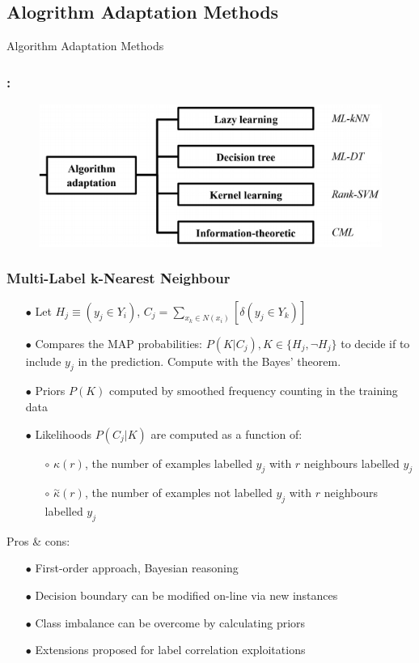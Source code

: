 \documentclass{beamer}
\begin{document}
\subsection{Alogrithm Adaptation Methods}
\begin{frame}
\Huge{\centerline{Algorithm Adaptation Methods}}
\end{frame}
\begin{frame}
\frametitle{\insertsection : \insertsubsection}
\begin{figure}
\begin{center}
\includegraphics[scale = 0.75]{images/aa.png}
\end{center}
\end{figure}
\end{frame}
\begin{frame}
\frametitle{Multi-Label k-Nearest Neighbour}
\begin{itemize}
	\item[$\bullet$] Let $H_j \equiv (y_j \in Y_i)$, $C_j = \sum_{x_k \in N(x_i)} [\delta(y_j \in Y_k)]$
\item[$\bullet$] Compares the MAP probabilities: $P(K|C_j), K \in \{H_j, \neg H_j\}$ to decide if to include $y_j$ in the prediction. Compute with the Bayes' theorem.
\item[$\bullet$] Priors $P(K)$ computed by smoothed frequency counting in the training data
\item[$\bullet$] Likelihoods $P(C_j|K)$ are computed as a function of:
\begin{itemize}
\item[$\circ$] $\kappa(r)$, the number of examples labelled $y_j$ with $r$ neighbours labelled $y_j$
\item[$\circ$] $\overset{\sim}{\kappa}(r)$, the number of examples not labelled $y_j$ with $r$ neighbours labelled $y_j$
\end{itemize}
\end{itemize}

Pros \& cons:
\begin{itemize}
\item[$\bullet$] First-order approach, Bayesian reasoning
\item[$\bullet$] Decision boundary can be modified on-line via new instances
\item[$\bullet$] Class imbalance can be overcome by calculating priors
\item[$\bullet$] Extensions proposed for label correlation exploitations
\end{itemize}


\end{frame}
\end{document}

